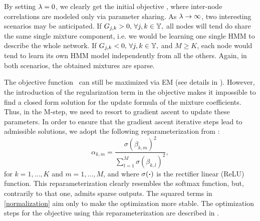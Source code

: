 By setting $\lambda=0$, we clearly get the initial objective , where inter-node correlations are modeled only via parameter sharing. As $\lambda \to \infty$, two interesting scenarios may be anticipated. If ${G}_{j,k} > 0, \, \forall j,k \in {\mathbb{Y}},$ all nodes will tend do share the same single mixture component, i.e. we would be learning one single HMM to describe the whole network. If ${G}_{j,k} < 0, \, \forall j,k \in {\mathbb{Y}},$ and $M \geq K$, each node would tend to learn its own HMM model independently from all the others. Again, in both scenarios, the obtained mixtures are sparse.

The objective function~ can still be maximized via EM (see details in ). However, the introduction of the regularization term in the objective makes it impossible to find a closed form solution for the update formula of the mixture coefficients. Thus, in the M-step, we need to resort to gradient ascent to update these parameters. In order to ensure that the gradient ascent iterative steps lead to admissible solutions, we adopt the following reparameterization from \cite{Yang2018}:
\begin{equation}
\label{normalization}
\alpha_{k,m} = \frac{\sigma \left(\beta_{k,m} \right)^2}{\sum_{l=1}^M \sigma \left( \beta_{k,l} \right)^2}, 
\end{equation}
for $k = 1, ..., K$ and $m = 1, ..., M$, and where $\sigma(\boldsymbol{\cdot})$ is the rectifier linear (ReLU) function. This reparameterization clearly resembles the softmax function, but, contrarily to that one, admits sparse outputs. The squared terms in \eqref{normalization} aim only to make the optimization more stable. The optimization steps for the objective  using this reparameterization are described in .

